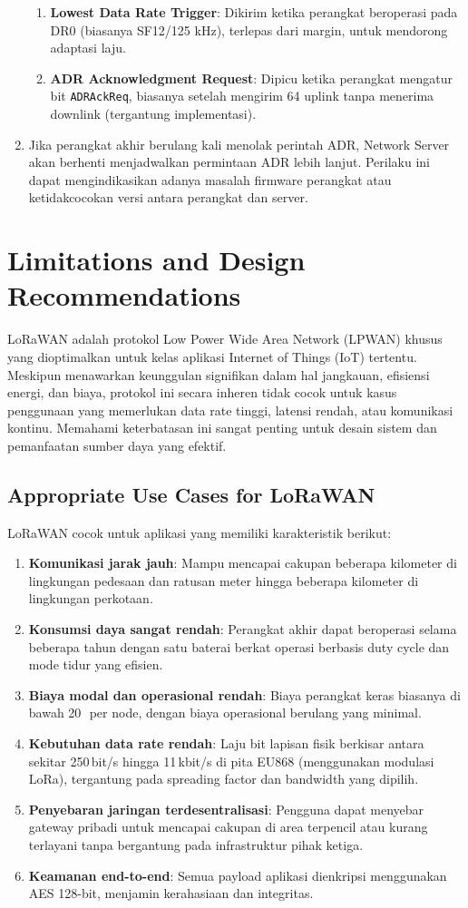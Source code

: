 \begin{enumerate}
\begin{enumerate}
              \item \textbf{Lowest Data Rate Trigger}: Dikirim ketika perangkat beroperasi pada DR0 (biasanya SF12/125 kHz), terlepas dari margin, untuk mendorong adaptasi laju.
              \item \textbf{ADR Acknowledgment Request}: Dipicu ketika perangkat mengatur bit \texttt{ADRAckReq}, biasanya setelah mengirim 64 uplink tanpa menerima downlink (tergantung implementasi).
          \end{enumerate}
    \item Jika perangkat akhir berulang kali menolak perintah ADR, Network Server akan berhenti menjadwalkan permintaan ADR lebih lanjut. Perilaku ini dapat mengindikasikan adanya masalah firmware perangkat atau ketidakcocokan versi antara perangkat dan server.
\end{enumerate}
\section{Limitations and Design Recommendations}
LoRaWAN adalah protokol Low Power Wide Area Network (LPWAN) khusus yang dioptimalkan untuk kelas aplikasi Internet of Things (IoT) tertentu. Meskipun menawarkan keunggulan signifikan dalam hal jangkauan, efisiensi energi, dan biaya, protokol ini secara inheren tidak cocok untuk kasus penggunaan yang memerlukan data rate tinggi, latensi rendah, atau komunikasi kontinu. Memahami keterbatasan ini sangat penting untuk desain sistem dan pemanfaatan sumber daya yang efektif.
\subsection{Appropriate Use Cases for LoRaWAN}
LoRaWAN cocok untuk aplikasi yang memiliki karakteristik berikut:
\begin{enumerate}
    \item \textbf{Komunikasi jarak jauh}: Mampu mencapai cakupan beberapa kilometer di lingkungan pedesaan dan ratusan meter hingga beberapa kilometer di lingkungan perkotaan.
    \item \textbf{Konsumsi daya sangat rendah}: Perangkat akhir dapat beroperasi selama beberapa tahun dengan satu baterai berkat operasi berbasis duty cycle dan mode tidur yang efisien.
    \item \textbf{Biaya modal dan operasional rendah}: Biaya perangkat keras biasanya di bawah 20\,\texteuro\ per node, dengan biaya operasional berulang yang minimal.
    \item \textbf{Kebutuhan data rate rendah}: Laju bit lapisan fisik berkisar antara sekitar 250\,bit/s hingga 11\,kbit/s di pita EU868 (menggunakan modulasi LoRa), tergantung pada spreading factor dan bandwidth yang dipilih.
    \item \textbf{Penyebaran jaringan terdesentralisasi}: Pengguna dapat menyebar gateway pribadi untuk mencapai cakupan di area terpencil atau kurang terlayani tanpa bergantung pada infrastruktur pihak ketiga.
    \item \textbf{Keamanan end-to-end}: Semua payload aplikasi dienkripsi menggunakan AES 128-bit, menjamin kerahasiaan dan integritas.
\end{enumerate}
